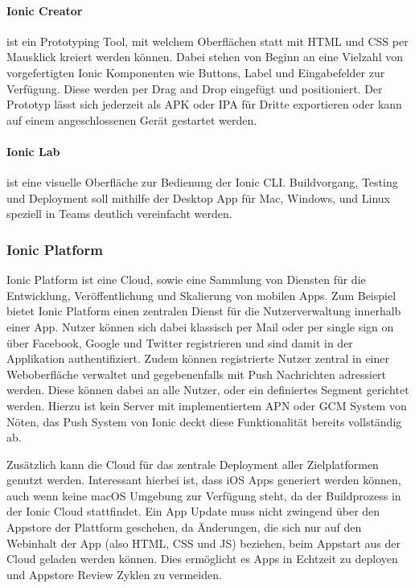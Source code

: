 \paragraph{Ionic Creator}
ist ein Prototyping Tool, mit welchem Oberflächen statt
mit HTML und CSS per Mausklick kreiert werden können.
Dabei stehen von Beginn an eine Vielzahl von vorgefertigten Ionic Komponenten wie Buttons,
Label und Eingabefelder zur Verfügung.
Diese werden per Drag and Drop eingefügt und positioniert. Der Prototyp lässt sich jederzeit
als \ac{APK} oder \ac{IPA} für Dritte exportieren oder kann auf einem angeschlossenen Gerät gestartet werden.

\paragraph{Ionic Lab}
ist eine visuelle Oberfläche zur Bedienung der Ionic \ac{CLI}.
Buildvorgang, Testing und Deployment soll mithilfe der Desktop App für Mac, Windows, und
Linux speziell in Teams deutlich vereinfacht werden. \cite{Ionic75:online}

\subsubsection{Ionic Platform}

Ionic Platform ist eine Cloud, sowie eine Sammlung von Diensten für die Entwicklung,
Veröffentlichung und Skalierung von mobilen Apps. Zum Beispiel bietet Ionic Platform einen zentralen Dienst für die Nutzerverwaltung innerhalb einer App.
Nutzer können sich dabei klassisch per Mail oder per single sign on über
Facebook, Google und Twitter registrieren und sind damit in der Applikation authentifiziert.
Zudem können registrierte Nutzer zentral in einer Weboberfläche verwaltet und gegebenenfalls mit Push Nachrichten adressiert werden.
Diese können dabei an alle Nutzer, oder ein definiertes Segment gerichtet werden.
Hierzu ist kein Server mit implementiertem \ac{APN} oder \ac{GCM} System von Nöten, das Push System von Ionic deckt diese
Funktionalität bereits vollständig ab.

Zusätzlich kann die Cloud für das zentrale Deployment aller Zielplatformen genutzt werden.
Interessant hierbei ist, dass iOS Apps generiert werden können, auch wenn
keine macOS Umgebung zur Verfügung steht, da der Buildprozess in der Ionic Cloud stattfindet.
Ein App Update muss nicht zwingend über den Appstore der Plattform geschehen,
da Änderungen, die sich nur auf den Webinhalt der App (also HTML, CSS und JS) beziehen,
beim Appstart aus der Cloud geladen werden können.
Dies ermöglicht es Apps in Echtzeit zu deployen und Appstore Review Zyklen zu vermeiden.


